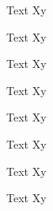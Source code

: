 \documentclass{article}
\begin{document}
\clearpage
\begin{minipage}{1.5cm}

\begin{adjustbox}{background={\color{gray}XXXX}}
    Text Xy
\end{adjustbox}

\begin{adjustbox}{background={angle=30}{\color{gray}XXXX}}
    Text Xy
\end{adjustbox}

\begin{adjustbox}{background*={\color{gray}XXXX}}
    Text Xy
\end{adjustbox}

\begin{adjustbox}{background*={angle=30}{\color{gray}XXXX}}
    Text Xy
\end{adjustbox}

\begin{adjustbox}{foreground={\color{gray}XXXX}}
    Text Xy
\end{adjustbox}

\begin{adjustbox}{foreground={angle=30,clip}{\color{gray}XXXX}}
    Text Xy
\end{adjustbox}

\begin{adjustbox}{foreground*={\color{gray}XXXX}}
    Text Xy
\end{adjustbox}

\begin{adjustbox}{foreground*={angle=30,clip}{\color{gray}XXXX}}
    Text Xy
\end{adjustbox}

\end{minipage}
\hspace{1mm}
\end{document}
